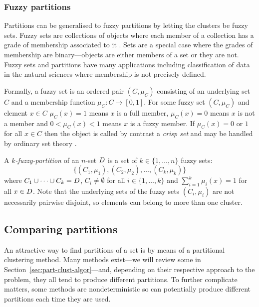 \subsubsection{Fuzzy partitions}
\label{sec:fuzzy-partitions}

Partitions can be generalised to fuzzy partitions by letting the clusters be
fuzzy sets.  Fuzzy sets are collections of objects where each member of a
collection has a grade of membership associated to it \citep{zadeh1965fuzzy}.
Sets are a special case where the grades of membership are binary---objects
are either members of a set or they are not.  Fuzzy sets and partitions have
many applications including classification of data in the natural sciences
where membership is not precisely defined.

Formally, a fuzzy set is an ordered pair $(C,\mu_{C})$ consisting of an
underlying set $C$ and a membership function $\mu_{C} \colon C \to [0,1]$.
For some fuzzy set $(C,\mu_C)$ and element $x \in C$ $\mu_C(x) = 1$ means $x$
is a full member, $\mu_C(x) = 0$ means $x$ is not a member and $0 < \mu_C(x) <
1$ means $x$ is a fuzzy member.  If $\mu_C(x) = 0$ or $1$ for all $x \in C$
then the object is called by contrast a \textit{crisp set} and may be handled
by ordinary set theory \cite{zadeh1965fuzzy,klir1995fuzzy}.

A \textit{$k$-fuzzy-partition} of an $n$-set $D$ is a set of $k \in
\{1,\dotsc,n\}$ fuzzy sets: \[\big\{(C_1,\mu_1),(C_2,\mu_2),\dotsc,(C_k,\mu_k)\big\}\]
where $C_1 \cup \dotsb \cup C_k = D$, $C_i \neq \emptyset$ for all $i \in
\{1,\dotsc,k\}$ and $\sum_{i=1}^{k} \mu_i(x) = 1$ for all $x \in D$.  Note
that the underlying sets of the fuzzy sets $(C_i,\mu_i)$ are not necessarily
pairwise disjoint, so elements can belong to more than one cluster.

\subsection{Comparing partitions}
\label{sec:comparing-partitions}

An attractive way to find partitions of a set is by means of a partitional
clustering method.  Many methods exist---we will review some in
Section~\ref{sec:part-clust-algor}---and, depending on their respective
approach to the problem, they all tend to produce different partitions.  To
further complicate matters, some methods are nondeterministic so can
potentially produce different partitions each time they are used.

